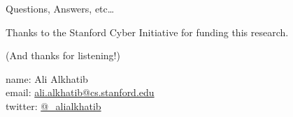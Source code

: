 \documentclass[presentation]{subfiles}
\begin{document}
  \begin{frame}{Questions, Answers, etc\dots}

      Thanks to the Stanford Cyber Initiative for funding this research.

      (And thanks for listening!)
  
      name: {Ali Alkhatib} \\
      email: \href{mailto:ali.alkhatib@cs.stanford.edu}{ali.alkhatib@cs.stanford.edu} \\
      twitter: \href{https://twitter.com/_alialkhatib}{@\_alialkhatib} \\
  \end{frame}
\end{document}
